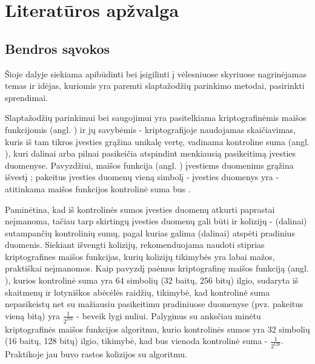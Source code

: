 \documentclass{VUMIFInfBakalaurinis}
\begin{document}
\section{Literatūros apžvalga}
\subsection{Bendros sąvokos}
Šioje dalyje siekiama apibūdinti bei įsigilinti į vėlesniuose skyriuose 
nagrinėjamas temas ir idėjas, kuriomis yra paremti slaptažodžių parinkimo 
metodai, pasirinkti sprendimai.

 \label{sec:hashing}
Slaptažodžių parinkimui bei saugojimui yra pasitelkiama kriptografinėmis maišos 
funkcijomis (angl. ) ir jų savybėmis - kriptografijoje 
naudojamas skaičiavimas, kuris iš tam tikros įvesties grąžina unikalę vertę, 
vadinama kontroline suma (angl. ), kuri dalinai arba pilnai 
pasikeičia atspindint menkiausią pasikeitimą įvesties duomenyse. Pavyzdžiui, 
maišos funkcija  (angl. ) 
įvestiems duomenims  grąžina išvestį 
; pakeitus įvesties duomenų vieną 
simbolį - įvesties duomenys yra  - atitinkama 
 maišos funkcijos kontrolinė suma bus 
.

Paminėtina, kad iš kontrolinės sumos įvesties duomenų atkurti paprastai 
neįmanoma, tačiau tarp skirtingų įvesties duomenų gali būti ir kolizijų - 
(dalinai) sutampančių kontrolinių sumų, pagal kurias galima (dalinai) atspėti 
pradinius duomenis. Siekiant išvengti kolizijų, rekomenduojama naudoti stiprias 
kriptografines maišos funkcijas, kurių kolizijų tikimybės yra labai mažos, 
praktiškai neįmanomos. Kaip pavyzdį paėmus  kriptografinę 
maišos funkciją (angl. ), kurios 
kontrolinė suma yra 64 simbolių (32 baitų, 256 bitų) ilgio, sudaryta iš 
skaitmenų ir lotyniškos abėcėlės raidžių, tikimybė, kad kontrolinė suma 
nepasikeistų net su mažiausiu pasikeitimu pradiniuose duomenyse (pvz. pakeitus 
vieną bitą) yra $\frac{1}{2^{256}}$ - beveik lygi nuliui. Palyginus su anksčiau 
minėtu  kriptografinės maišos funkcijos algoritmu, kurio 
kontrolinės sumos yra 32 simbolių (16 baitų, 128 bitų) ilgio, tikimybė, kad bus 
vienoda kontrolinė suma - $\frac{1}{2^{128}}$. Praktikoje jau buvo rastos 
kolizijos su  algoritmu.
\end{document}
